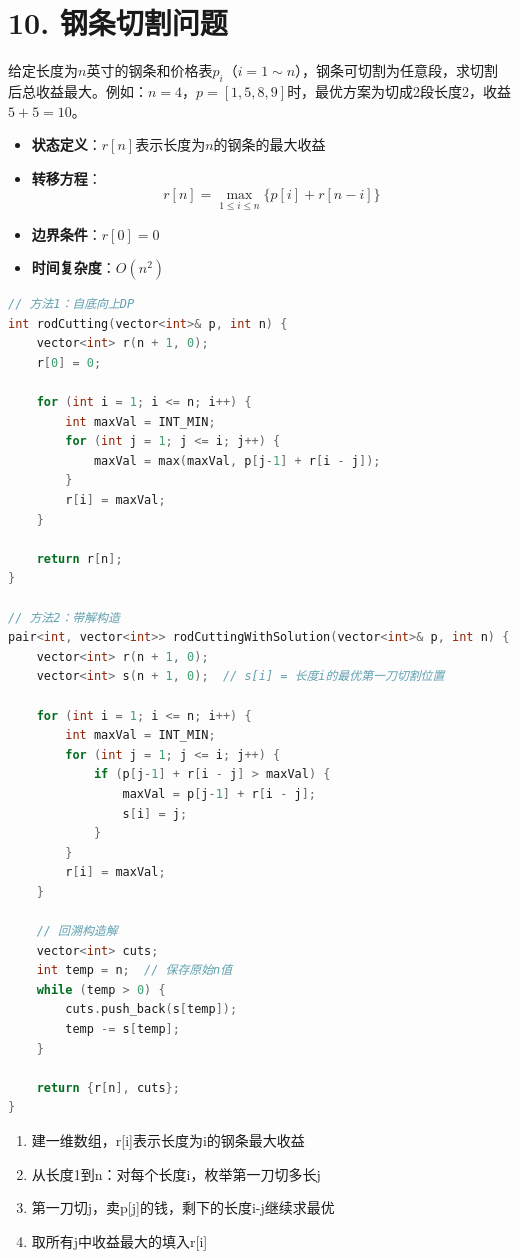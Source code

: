 \section*{10. 钢条切割问题}

给定长度为$n$英寸的钢条和价格表$p_i$（$i=1 \sim n$），钢条可切割为任意段，求切割后总收益最大。例如：$n=4$，$p=[1,5,8,9]$时，最优方案为切成2段长度2，收益$5+5=10$。



\begin{itemize}
    \item \textbf{状态定义}：$r[n]$表示长度为$n$的钢条的最大收益
    \item \textbf{转移方程}：$$r[n] = \max_{1 \le i \le n} \{p[i] + r[n-i]\}$$
    \item \textbf{边界条件}：$r[0] = 0$
    \item \textbf{时间复杂度}：$O(n^2)$
\end{itemize}
\begin{lstlisting}[language=C++, style=cppstyle]
// 方法1：自底向上DP
int rodCutting(vector<int>& p, int n) {
    vector<int> r(n + 1, 0);
    r[0] = 0;

    for (int i = 1; i <= n; i++) {
        int maxVal = INT_MIN;
        for (int j = 1; j <= i; j++) {
            maxVal = max(maxVal, p[j-1] + r[i - j]);
        }
        r[i] = maxVal;
    }

    return r[n];
}

// 方法2：带解构造
pair<int, vector<int>> rodCuttingWithSolution(vector<int>& p, int n) {
    vector<int> r(n + 1, 0);
    vector<int> s(n + 1, 0);  // s[i] = 长度i的最优第一刀切割位置

    for (int i = 1; i <= n; i++) {
        int maxVal = INT_MIN;
        for (int j = 1; j <= i; j++) {
            if (p[j-1] + r[i - j] > maxVal) {
                maxVal = p[j-1] + r[i - j];
                s[i] = j;
            }
        }
        r[i] = maxVal;
    }

    // 回溯构造解
    vector<int> cuts;
    int temp = n;  // 保存原始n值
    while (temp > 0) {
        cuts.push_back(s[temp]);
        temp -= s[temp];
    }

    return {r[n], cuts};
}
\end{lstlisting}


\begin{enumerate}
    \item 建一维数组，r[i]表示长度为i的钢条最大收益
    \item 从长度1到n：对每个长度i，枚举第一刀切多长j
    \item 第一刀切j，卖p[j]的钱，剩下的长度i-j继续求最优
    \item 取所有j中收益最大的填入r[i]
\end{enumerate}

